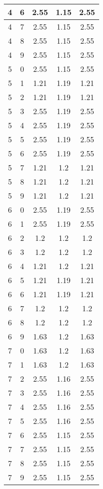 \begin{longtable}{|c|c||c||c||c|}
	4 & 6 & 2.55 & 1.15 & 2.55 \\ \hline
	4 & 7 & 2.55 & 1.15 & 2.55 \\ \hline
	4 & 8 & 2.55 & 1.15 & 2.55 \\ \hline
	4 & 9 & 2.55 & 1.15 & 2.55 \\ \hline
	5 & 0 & 2.55 & 1.15 & 2.55 \\ \hline
	5 & 1 & 1.21 & 1.19 & 1.21 \\ \hline
	5 & 2 & 1.21 & 1.19 & 1.21 \\ \hline
	5 & 3 & 2.55 & 1.19 & 2.55 \\ \hline
	5 & 4 & 2.55 & 1.19 & 2.55 \\ \hline
	5 & 5 & 2.55 & 1.19 & 2.55 \\ \hline
	5 & 6 & 2.55 & 1.19 & 2.55 \\ \hline
	5 & 7 & 1.21 & 1.2 & 1.21 \\ \hline
	5 & 8 & 1.21 & 1.2 & 1.21 \\ \hline
	5 & 9 & 1.21 & 1.2 & 1.21 \\ \hline
	6 & 0 & 2.55 & 1.19 & 2.55 \\ \hline
	6 & 1 & 2.55 & 1.19 & 2.55 \\ \hline
	6 & 2 & 1.2 & 1.2 & 1.2 \\ \hline
	6 & 3 & 1.2 & 1.2 & 1.2 \\ \hline
	6 & 4 & 1.21 & 1.2 & 1.21 \\ \hline
	6 & 5 & 1.21 & 1.19 & 1.21 \\ \hline
	6 & 6 & 1.21 & 1.19 & 1.21 \\ \hline
	6 & 7 & 1.2 & 1.2 & 1.2 \\ \hline
	6 & 8 & 1.2 & 1.2 & 1.2 \\ \hline
	6 & 9 & 1.63 & 1.2 & 1.63 \\ \hline
	7 & 0 & 1.63 & 1.2 & 1.63 \\ \hline
	7 & 1 & 1.63 & 1.2 & 1.63 \\ \hline
	7 & 2 & 2.55 & 1.16 & 2.55 \\ \hline
	7 & 3 & 2.55 & 1.16 & 2.55 \\ \hline
	7 & 4 & 2.55 & 1.16 & 2.55 \\ \hline
	7 & 5 & 2.55 & 1.16 & 2.55 \\ \hline
	7 & 6 & 2.55 & 1.15 & 2.55 \\ \hline
	7 & 7 & 2.55 & 1.15 & 2.55 \\ \hline
	7 & 8 & 2.55 & 1.15 & 2.55 \\ \hline
	7 & 9 & 2.55 & 1.15 & 2.55 \\ \hline
\end{longtable}

